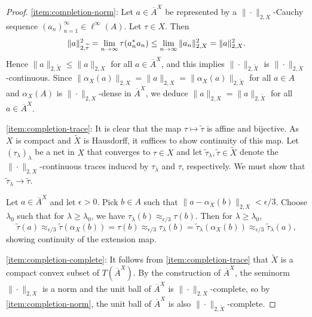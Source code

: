 \documentclass[a4paper,11pt]{amsart}
\theoremstyle{definition}
\numberwithin{equation}{section}
\numberwithin{theorem}{section}
\newcommand{\completion}[2]{\overline{#1}^{#2}}
\begin{document}
\begin{proof}
	\ref{item:completion-norm}: Let $a \in \completion{A}{X}$ be represented by a $\|\cdot\|_{2,X}$-Cauchy sequence $(a_n)_{n=1}^\infty \in \ell^\infty(A)$. Let $\tau \in X$. Then
	\begin{equation}\label{eq:unbounded-continuity}
		\|a\|_{2,\widetilde{\tau}}^2 = \lim_{n\rightarrow\infty} \tau(a_n^*a_n)
		\leq \lim_{n\rightarrow\infty} \|a_n\|_{2,X}^2\\
		= \|a\|_{2,X}^2.
	\end{equation}
	Hence $\|a\|_{2,\widetilde{X}} \leq \|a\|_{2,X}$ for all $a \in \completion{A}{X}$, and this implies $\|\cdot\|_{2, \widetilde{X}}$ is $\|\cdot\|_{2, X}$-continuous.  Since $\|\alpha_X(a)\|_{2,X}=\|a\|_{2,X} = \|\alpha_X (a)\|_{2, \widetilde{X}}$ for all $a \in A$ and  $\alpha_X(A)$ is $\|\cdot\|_{2, X}$-dense in $\completion{A}{X}$, we deduce $\|a\|_{2,X} = \|a\|_{2, \widetilde{X}}$ for all $a \in \completion{A}{X}$.
	
	\ref{item:completion-trace}: It is clear that the map $\tau \mapsto \widetilde{\tau}$ is affine and bijective.  As $X$ is compact and $\widetilde{X}$ is Hausdorff, it suffices to show continuity of this map.  Let $(\tau_\lambda)_\lambda$ be a net in $X$ that converges to $\tau \in X$ and let $\widetilde{\tau}_\lambda,\widetilde{\tau} \in \widetilde{X}$ denote the $\|\cdot\|_{2,X}$-continuous traces induced by $\tau_\lambda$ and $\tau$, respectively.  We must show that $\widetilde\tau_\lambda \to \widetilde\tau$.
	
	Let $a \in \completion{A}{X}$ and let $\epsilon>0$. Pick $b \in A$ such that $\|a-\alpha_X(b)\|_{2,X} < \epsilon/3$. Choose $\lambda_0$ such that for $\lambda \geq \lambda_0$, we have $\tau_{\lambda}(b)\approx_{\epsilon/3} \tau(b)$. Then for $\lambda \geq \lambda_0$,
	\begin{equation}
		\widetilde\tau(a) \approx_{\epsilon/3} \widetilde\tau(\alpha_X(b)) = \tau(b) \approx_{\epsilon/3} \tau_\lambda(b) = \widetilde\tau_\lambda(\alpha_X(b)) \approx_{\epsilon/3} \widetilde\tau_\lambda(a),
	\end{equation}
	showing continuity of the extension map.
	
	\ref{item:completion-complete}: It follows from \ref{item:completion-trace} that $\widetilde X$ is a compact convex subset of $T(\completion{A}{X})$.  By the construction of $\completion{A}{X}$, the seminorm $\|\cdot\|_{2, X}$ is a norm and the unit ball of $\completion{A}{X}$ is $\|\cdot\|_{2, X}$-complete, so by \ref{item:completion-norm}, the unit ball of $\completion{A}{X}$ is also $\|\cdot\|_{2, \widetilde{X}}$-complete.
	

\end{proof}
\end{document}
